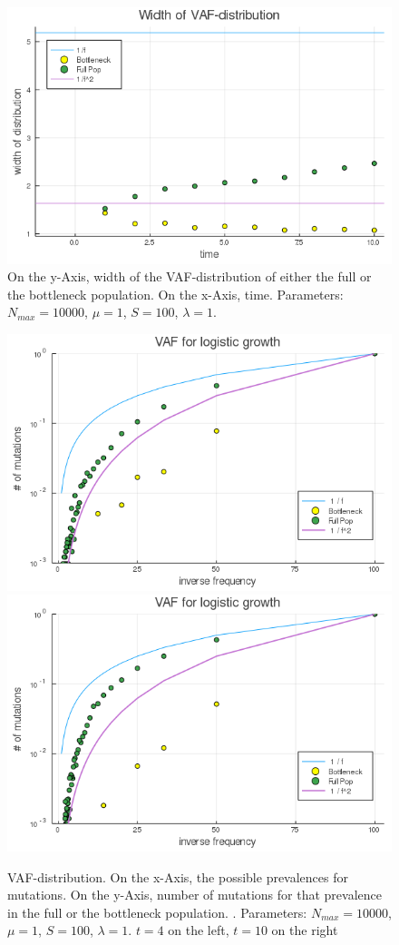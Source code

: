 \documentclass{article}
\numberwithin{equation}{subsection}
\begin{document}
	\begin{figure}[h!]
		\centering
		\includegraphics[width=\linewidth]{Figures/LogGrowth/document/LogGrowthBasic/LogVarTimesAlt_N10000_mu1_t10_d1_C0}
		
		\caption{On the y-Axis, width of the VAF-distribution of either the full or the bottleneck population. On the x-Axis, time. Parameters: $ N_{max} = 10000$, $\mu = 1 $, $ S = 100 $, $ \lambda = 1$.}
		\label{fig::Width1}
	\end{figure}

		\begin{figure}[h!]
		\centering
		\includegraphics[width=0.49\linewidth]{Figures/LogGrowth/document/LogGrowthBasic/LogVarTimesC_N10000_mu1_t4_d1_C0}
		\includegraphics[width=0.49\linewidth]{Figures/LogGrowth/document/LogGrowthBasic/LogVarTimesC_N10000_mu1_t10_d1_C0}
		
		\caption{VAF-distribution. On the x-Axis, the possible prevalences for mutations. On the y-Axis, number of mutations for that prevalence in the full or the bottleneck population. . Parameters: $ N_{max} = 10000$, $\mu = 1 $, $ S = 100 $, $ \lambda = 1$. $ t =4 $ on the left, $ t= 10 $ on the right}
		\label{fig::VAF1}
	\end{figure}
\end{document}
